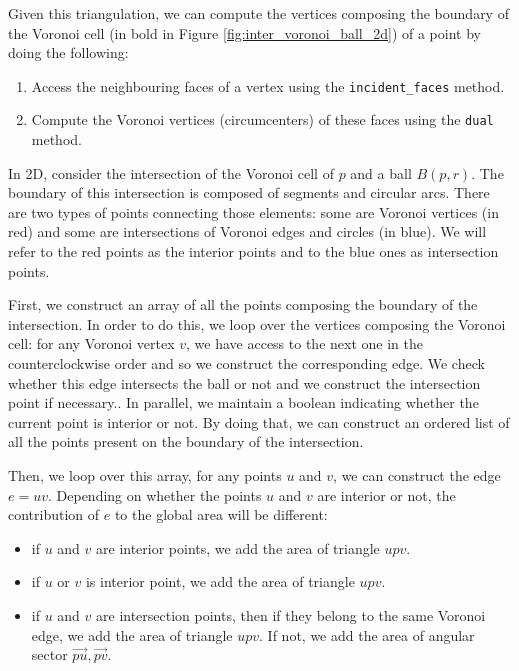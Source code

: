 Given this triangulation, we can compute the vertices composing the boundary of
the  Voronoi cell (in bold in Figure \ref{fig:inter_voronoi_ball_2d}) of a
point by doing the following:
\begin{enumerate}
    \item Access the neighbouring faces of a vertex using the
        \texttt{incident\_faces} method.
    \item Compute the Voronoi vertices (circumcenters) of these faces using the
        \texttt{dual} method.
\end{enumerate}

In 2D, consider the intersection of the Voronoi cell of $ p $ and a ball $ B(p,
r) $. The boundary of this intersection is composed of segments and circular
arcs. There are two types of points connecting those elements: some are Voronoi
vertices (in red) and some are intersections of Voronoi edges and circles (in
blue). We will refer to the red points as the interior points and to the blue
ones as intersection points.

First, we construct an array of all the points composing the boundary of the
intersection. In order to do this, we loop over the vertices composing the
Voronoi cell: for any Voronoi vertex $ v $, we have access to the next one in
the counterclockwise order and so we construct the corresponding edge. We check
whether this edge intersects the ball or not and we construct the intersection
point if necessary.. In parallel, we maintain a boolean indicating whether the
current point is interior or not. By doing that, we can construct an ordered
list of all the points present on the boundary of the intersection.

Then, we loop over this array, for any points $ u $ and $ v $, we can construct
the edge $ e = uv $. Depending on whether the points $ u $ and $ v $ are
interior or not, the contribution of $ e $ to the global area will be different:
\begin{itemize}
    \item if $ u $ and $ v $ are interior points, we add the area of triangle $ upv $.
    \item if $ u $ or $ v $ is interior point, we add the area of triangle $ upv $.
    \item if $ u $ and $ v $ are intersection points, then if they belong to the
        same Voronoi edge, we add the area of triangle $ upv $. If not, we add the
        area of angular sector $ \vec{pu}, \vec{pv} $.
\end{itemize}

